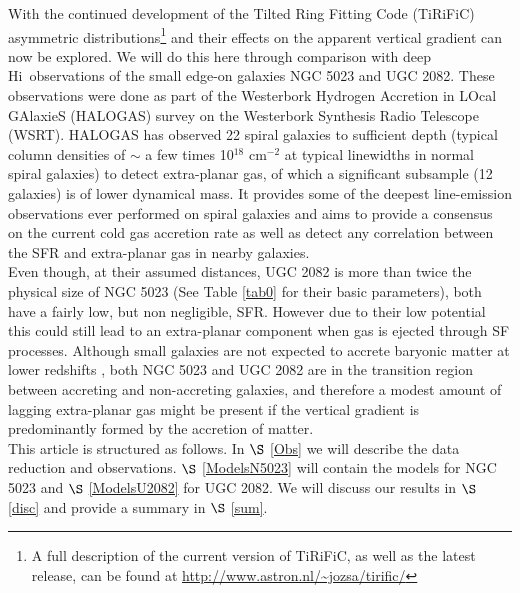 \documentclass[useAMS,usenatbib]{mn2e}
\newcommand\tiri{{\sc TiRiFiC}}
\newcommand\HI{H{\sc i}}
\begin{document}
 \indent With the continued development of the Tilted Ring Fitting Code (\tiri) \citep{Joshtirific2007} asymmetric distributions\footnote{ A full description of the current version of {\sc TiRiFiC}, as well as the latest release, can be found at \url{http://www.astron.nl/~jozsa/tirific/}} and their effects on the apparent vertical gradient can now be explored. We will do this here through comparison with deep \HI\  observations of the  small edge-on  galaxies NGC 5023 and UGC 2082.  These observations were done as part of the Westerbork Hydrogen Accretion in LOcal GAlaxieS (HALOGAS) survey \citep{2011A&A...526A.118H} on the Westerbork Synthesis Radio Telescope (WSRT).  HALOGAS has observed 22 spiral galaxies to sufficient depth (typical column densities of $\sim$ a few times 10$^{18}$ cm$^{-2}$ at typical linewidths in normal spiral galaxies) to detect extra-planar gas, of which a significant subsample (12 galaxies) is of lower dynamical mass. It provides some of the deepest line-emission observations ever performed on spiral galaxies and  aims to provide a consensus on the current cold gas accretion rate as well as detect any correlation between the SFR and extra-planar gas in nearby galaxies.  \\
\indent Even though, at their assumed distances, UGC 2082 is more than twice the physical size of NGC 5023 (See Table \ref{tab0} for their basic parameters), both have a fairly low, but non negligible, SFR. However due to their low potential this could still lead to an extra-planar component when gas is ejected through SF processes.  
Although small galaxies are not expected to accrete baryonic matter at lower redshifts \citep{2010AdAst2010E..87H}, both NGC 5023 and UGC 2082 are in the transition region between accreting and non-accreting galaxies, and therefore a modest amount of lagging extra-planar gas might be present if the vertical gradient is predominantly formed by the accretion of matter. \\ 
\indent This article is structured as follows. In $\S$ \ref{Obs}  we will describe the data reduction and observations. $\S$ \ref{ModelsN5023} will contain the models for NGC 5023 and   $\S$ \ref{ModelsU2082}  for UGC 2082.  We will discuss our results in $\S$ \ref{disc} and provide a summary in $\S$ \ref{sum}.
\end{document}
